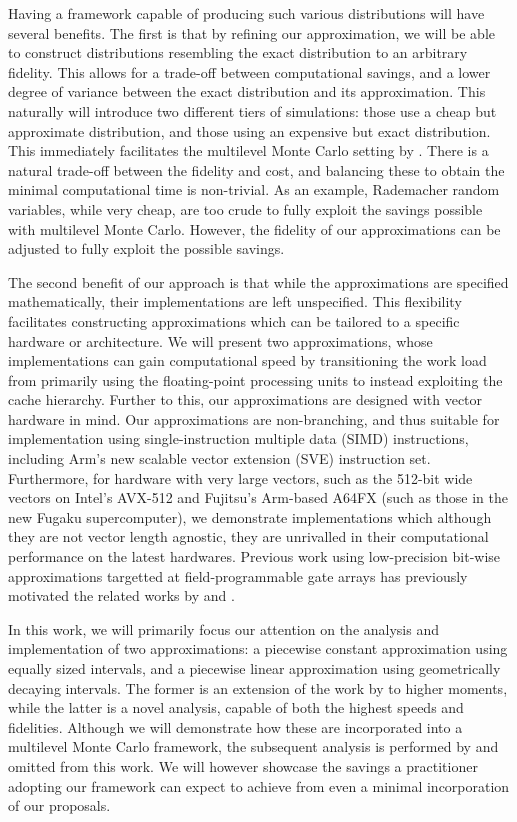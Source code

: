 \documentclass[manuscript,review]{acmart}
\begin{document}
Having a framework capable of producing such various distributions will have several benefits. The first is that by refining our approximation, we will be able to construct distributions resembling the exact distribution to an arbitrary fidelity. This allows for a trade-off between computational savings, and a lower degree of variance between the exact distribution and its approximation. This naturally will introduce two different tiers of simulations: those use a cheap but approximate distribution, and those using an expensive but exact distribution. This immediately facilitates the multilevel Monte Carlo setting by \citet{giles2008multilevel}. There is a natural trade-off between the fidelity and cost, and balancing these to obtain the minimal computational time is non-trivial. As an example, Rademacher random variables, while very cheap, are too crude to fully exploit the savings possible with multilevel Monte Carlo. However, the fidelity of our approximations can be adjusted to fully exploit the possible savings. 

The second benefit of our approach is that while the approximations are  specified mathematically, their implementations are left unspecified. This flexibility facilitates constructing approximations which can be tailored to a specific hardware or architecture. We will present two approximations, whose implementations can gain computational speed by transitioning the work load from primarily using the floating-point processing units to instead exploiting the cache hierarchy. Further to this, our approximations are designed with vector hardware in mind. Our approximations are non-branching, and thus suitable for implementation using single-instruction multiple data (SIMD) instructions, including Arm's new scalable vector extension (SVE) instruction set. Furthermore, for hardware with very large vectors, such as the 512-bit wide vectors on Intel's AVX-512 and Fujitsu's Arm-based A64FX (such as those in the new Fugaku supercomputer), we demonstrate implementations which although they are not vector length agnostic, they are unrivalled in their computational performance on the latest hardwares. Previous work using low-precision bit-wise approximations targetted at field-programmable gate arrays has previously motivated the related works by \citet{brugger2014mixed} and \citet{omland2015exploiting}.

In this work, we will primarily focus our attention on the analysis and implementation of two approximations: a piecewise constant approximation using equally sized intervals, and a piecewise linear approximation using geometrically decaying intervals. The former is an extension of the work by \citet[theorem~1]{giles2019random_quadrature} to higher moments, while the latter is a novel analysis, capable of both the highest speeds and fidelities. Although we will demonstrate how these are incorporated into a multilevel Monte Carlo framework, the subsequent analysis is performed by \citeauthor{giles2020approximate} \citep{giles2020approximate,sheridan2020nested} and omitted from this work. We will however showcase the savings a practitioner adopting our framework can expect to achieve from even a minimal incorporation of our proposals. 
\end{document}
